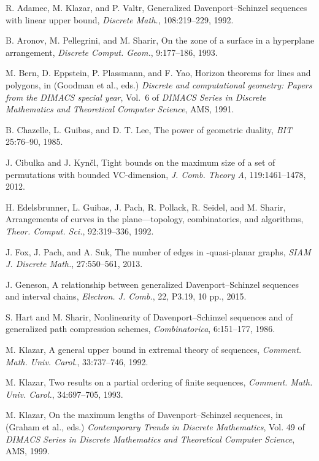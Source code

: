 \documentclass[11pt]{article}
\theoremstyle{definition}
\theoremstyle{remark}
\begin{document}
\begin{thebibliography}{99}
R. Adamec, M. Klazar, and P. Valtr, Generalized Davenport--Schinzel sequences with linear upper bound, \emph{Discrete Math.}, 108:219--229, 1992.

B. Aronov, M. Pellegrini, and M. Sharir, On the zone of a surface in a hyperplane arrangement, \emph{Discrete Comput. Geom.}, 9:177--186, 1993.

M. Bern, D. Eppstein, P. Plassmann, and F. Yao, Horizon theorems for lines and polygons, in (Goodman et al., eds.) \emph{Discrete and computational geometry: Papers from the DIMACS special year}, Vol.~6 of \emph{DIMACS Series in Discrete Mathematics and Theoretical Computer Science}, AMS, 1991.

B. Chazelle, L. Guibas, and D. T. Lee, The power of geometric duality, \emph{BIT} 25:76--90, 1985.

J. Cibulka and J. Kyn\v cl, Tight bounds on the maximum size of a set of permutations with bounded VC-dimension, \emph{J. Comb. Theory A}, 119:1461--1478, 2012.

H. Edelsbrunner, L. Guibas, J. Pach, R. Pollack, R. Seidel, and M. Sharir, Arrangements of curves in the plane---topology, combinatorics, and algorithms, \emph{Theor. Comput. Sci.}, 92:319--336, 1992.

J. Fox, J. Pach, and A. Suk, The number of edges in -quasi-planar graphs, \emph{SIAM J. Discrete Math.}, 27:550--561, 2013.

J. Geneson, A relationship between generalized Davenport--Schinzel sequences and interval chains, \emph{Electron. J. Comb.}, 22, P3.19, 10 pp., 2015.

S. Hart and M. Sharir, Nonlinearity of Davenport--Schinzel sequences and of generalized path compression schemes, \emph{Combinatorica}, 6:151--177, 1986.

M. Klazar, A general upper bound in extremal theory of sequences, \emph{Comment. Math. Univ. Carol.}, 33:737--746, 1992.

M. Klazar, Two results on a partial ordering of finite sequences, \emph{Comment. Math. Univ. Carol.}, 34:697--705, 1993.

M. Klazar, On the maximum lengths of Davenport--Schinzel sequences, in (Graham et al., eds.) \emph{Contemporary Trends in Discrete Mathematics}, Vol. 49 of \emph{DIMACS Series in Discrete Mathematics and Theoretical Computer Science}, AMS, 1999.


\end{thebibliography}
\end{document}
